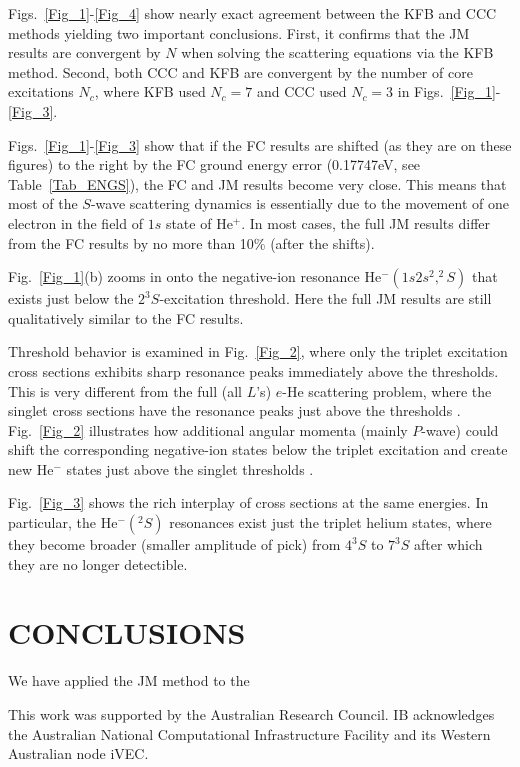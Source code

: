 \documentclass[aip
, pra
, showpacs
, aps
, twocolumn
, groupedaddress
, floatfix
]{revtex4}
\begin{document}
Figs.~\ref{Fig_1}-\ref{Fig_4} show nearly exact agreement between the KFB and CCC methods yielding two important conclusions.
First, it confirms that the JM results are convergent by $N$ when solving the scattering equations via the KFB method.
Second, both CCC and KFB are convergent by the number of core excitations $N_c$, where KFB used $N_c=7$ and CCC used $N_c=3$ in Figs.~\ref{Fig_1}-\ref{Fig_3}.

Figs.~\ref{Fig_1}-\ref{Fig_3} show that if the FC results are shifted (as they are on these figures) to the right by the FC ground energy error (0.17747eV, see Table~\ref{Tab_ENGS}),
the FC and JM results become very close. This means that most of the $S$-wave scattering dynamics  is essentially due to
the movement of one electron in the field of $1s$ state of He$^+$. In most cases, the full JM results differ from the FC results by no more than 10\% (after the shifts).


Fig.~\ref{Fig_1}(b) zooms in onto the negative-ion resonance He$^-(1s2s^2,^2S)$ that exists \cite{BC94} just below the $2^3S$-excitation threshold.
Here the full JM results are still qualitatively similar to the FC results.


Threshold behavior is examined in Fig.~\ref{Fig_2}, where only the triplet excitation cross sections exhibits sharp resonance peaks immediately above the thresholds.
This is very different from the full (all $L$'s) $e$-He scattering problem, where the singlet cross sections have the resonance peaks just above the thresholds \cite{PhysRevA.12.444, PhysRevA.54.R998}.
Fig.~\ref{Fig_2} illustrates how additional angular momenta (mainly $P$-wave) could shift the corresponding
negative-ion states below the triplet excitation and create new He$^-$ states just above the singlet thresholds \cite{PhysRevA.54.R998, SMC2006}.

Fig.~\ref{Fig_3} shows the rich interplay of cross sections at the same energies.
In particular, the He$^-(^2S)$ resonances exist just the triplet helium states, where they become broader (smaller amplitude of pick)
from $4^3S$ to $7^3S$ after which they are no longer detectible.

\section{CONCLUSIONS}

We have applied the JM method to the





\begin{acknowledgments}
This work was supported by the Australian Research Council. IB
acknowledges the Australian National Computational Infrastructure
Facility and its Western Australian node iVEC.
\end{acknowledgments}





\end{document}
